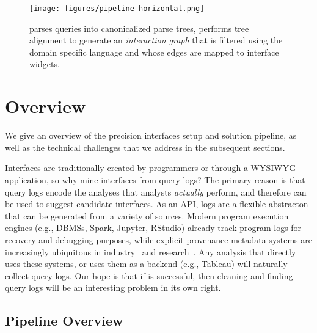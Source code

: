 \begin{figure*}[t]
\centering
\texttt{[image: figures/pipeline-horizontal.png]}
\caption{\sys parses queries into canonicalized parse trees, performs tree alignment to generate an {\it interaction graph} that is filtered using the \lang domain specific language and  whose edges are mapped to interface widgets.}
\label{f:pipeline}
\end{figure*}


\section{Overview}
\label{sec:overview}

We give an overview of the precision interfaces setup and solution pipeline, as well as the technical challenges that we address in the subsequent sections.

 Interfaces are traditionally created by programmers or through a WYSIWYG application, so why mine interfaces from query logs?  The primary reason is that query logs encode the analyses that analysts {\it actually} perform, and therefore can be used to suggest candidate interfaces. As an API, logs are a flexible abstracton that can be generated from a variety of sources.  Modern program execution engines (e.g., DBMSs, Spark, Jupyter, RStudio) already track program logs for recovery and debugging purposes, while explicit provenance metadata systems are increasingly ubiquitous in industry~\cite{ground,mavlyutovdependency} and research~\cite{ives2008orchestra,muniswamy2006provenance,callahan2006vistrails}.  Any analysis that directly uses these systems, or uses them as a backend (e.g., Tableau) will naturally collect query logs.  Our hope is that if \sys is successful, then cleaning and finding query logs will be an interesting problem in its own right.








\subsection{Pipeline Overview}

